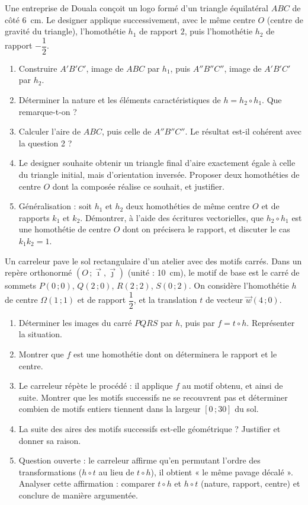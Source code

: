 \documentclass[11pt]{article}
\begin{document}
\begin{exercice}
Une entreprise de Douala conçoit un logo formé d'un triangle équilatéral $ABC$ de côté \SI{6}{\centi\meter}. Le designer applique successivement, avec le même centre $O$ (centre de gravité du triangle), l'homothétie $h_1$ de rapport $2$, puis l'homothétie $h_2$ de rapport $-\dfrac{1}{2}$.
\begin{enumerate}
\item Construire $A'B'C'$, image de $ABC$ par $h_1$, puis $A''B''C''$, image de $A'B'C'$ par $h_2$.
\item Déterminer la nature et les éléments caractéristiques de $h = h_2 \circ h_1$. Que remarque-t-on ?
\item Calculer l'aire de $ABC$, puis celle de $A''B''C''$. Le résultat est-il cohérent avec la question 2 ?
\item Le designer souhaite obtenir un triangle final d'aire exactement égale à celle du triangle initial, mais d'orientation inversée. Proposer deux homothéties de centre $O$ dont la composée réalise ce souhait, et justifier.
\item Généralisation : soit $h_1$ et $h_2$ deux homothéties de même centre $O$ et de rapports $k_1$ et $k_2$. Démontrer, à l'aide des écritures vectorielles, que $h_2 \circ h_1$ est une homothétie de centre $O$ dont on précisera le rapport, et discuter le cas $k_1 k_2 = 1$.
\end{enumerate}
\end{exercice}

\begin{exercice}
Un carreleur pave le sol rectangulaire d'un atelier avec des motifs carrés. Dans un repère orthonormé $(O\,;\vec{\imath},\vec{\jmath})$ (unité : \SI{10}{\centi\meter}), le motif de base est le carré de sommets $P(0\,;0)$, $Q(2\,;0)$, $R(2\,;2)$, $S(0\,;2)$. On considère l'homothétie $h$ de centre $\Omega(1\,;1)$ et de rapport $\dfrac{1}{2}$, et la translation $t$ de vecteur $\vec{w}(4\,;0)$.
\begin{enumerate}
\item Déterminer les images du carré $PQRS$ par $h$, puis par $f = t \circ h$. Représenter la situation.
\item Montrer que $f$ est une homothétie dont on déterminera le rapport et le centre.
\item Le carreleur répète le procédé : il applique $f$ au motif obtenu, et ainsi de suite. Montrer que les motifs successifs ne se recouvrent pas et déterminer combien de motifs entiers tiennent dans la largeur $[0\,;30]$ du sol.
\item La suite des aires des motifs successifs est-elle géométrique ? Justifier et donner sa raison.
\item Question ouverte : le carreleur affirme qu'en permutant l'ordre des transformations ($h \circ t$ au lieu de $t \circ h$), il obtient « le même pavage décalé ». Analyser cette affirmation : comparer $t \circ h$ et $h \circ t$ (nature, rapport, centre) et conclure de manière argumentée.
\end{enumerate}
\end{exercice}
\end{document}
